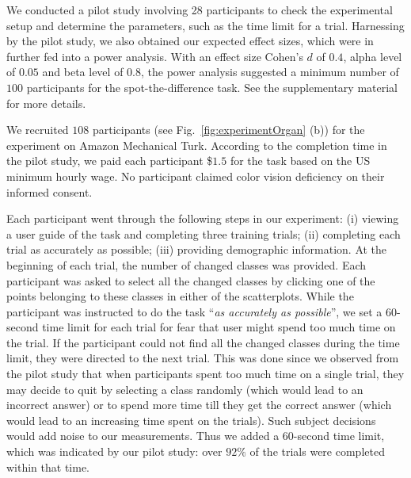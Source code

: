 {\vspace{.3em}
We conducted a pilot study involving 28 participants to check the experimental setup and determine the parameters, such as the time limit for a trial.
Harnessing by the pilot study, we also obtained our expected effect sizes, which were in further fed into a power analysis. With an effect size Cohen's $d$ of $0.4$, alpha level of $0.05$ and beta level of $0.8$, the power analysis suggested a minimum number of $100$ participants for the spot-the-difference task. See the supplementary material for more details.


\vspace{.3em}
We recruited $108$ participants (see Fig.~\ref{fig:experimentOrgan} (b)) for the experiment on Amazon Mechanical Turk.
According to the completion time in the pilot study, we paid each participant \$$1.5$ for the task based on the US minimum hourly wage.
No participant claimed color vision deficiency on their informed consent.

\vspace{.3em}
Each participant went through the following steps in our experiment: (i) viewing a user guide of the task and completing three training trials; (ii) completing each trial as accurately as possible; (iii) providing demographic information. At the beginning of each trial, the number of changed classes was provided. Each participant was asked to select all the changed classes by clicking one of the points belonging to these classes in either of the scatterplots. While the participant was instructed to do the task ``\emph{as accurately as possible}'', we set a $60$-second time limit for each trial for fear that user might spend too much time on the trial. If the participant could not find all the changed classes during the time limit, they were directed to the next trial. %
This was done since we observed from the pilot study that when participants spent too much time on a single trial, they may decide to quit by selecting a class randomly (which would lead to an incorrect answer) or to spend more time till they get the correct answer
(which would lead to an increasing time spent on the trials). Such subject decisions would add noise to our measurements. Thus we added a $60$-second time limit, which was indicated by our pilot study: over $92\%$ of the trials were completed within that time.

}
